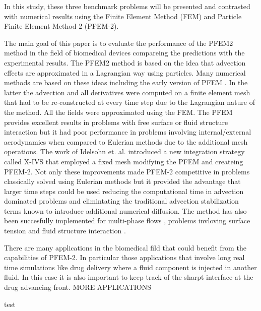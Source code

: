 In this study, these three benchmark problems will be presented and contrasted with numerical results using the Finite Element Method (FEM) and Particle Finite Element Method 2 (PFEM-2).


The main goal of this paper is to evaluate the performance of the PFEM2 method in the field of biomedical devices compareing the predictions with the experimental results. The PFEM2 method is based on the idea that advection effects are approximated in a Lagrangian way using particles. Many numerical methods are based on these ideas \cite{sph,mps,pic,mac} including the early version of PFEM \cite{sergio:PFEM}. In the latter the advection and all derivatives were computed on a finite element mesh that had to be re-constructed at every time step due to the Lagrangian nature of the method. All the fields were approximated using the FEM. The PFEM provides excellent results in problems with free surface or fluid structure interaction but it had poor performance in problems involving internal/external aerodynamics when compared to Eulerian methods due to the additional mesh operations. The work of Idelsohn et. al. \cite{sergio:xivs1,sergio:xivs2} introduced a new integration strategy called X-IVS that employed a fixed mesh modifying the PFEM and createing PFEM-2. Not only these improvements made PFEM-2 competitive in problems classically solved using Eulerian methods but it provided the advantage that larger time steps could be used \cite{gimenez:parallel} reducing the computational time in advection dominated problems and elimintating the traditional advection stabilization terms known to introduce additional numerical diffusion. The method has also been succesfully implemented for multi-phase flows \cite{sergio:pfem2_lts,gimenez:fs,gimenez:tesis}, problems invloving surface tension \cite{gimenez:st} and fluid structure interaction \cite{pablo:FSI}.

There are many applications in the biomedical fild that could benefit from the capabilities of PFEM-2. In particular those applications that involve long real time simulations like drug delivery where a fluid component is injected in another fluid. In this case it is also important to keep track of the sharpt interface at the drug advancing front. {MORE APPLICATIONS}

test
